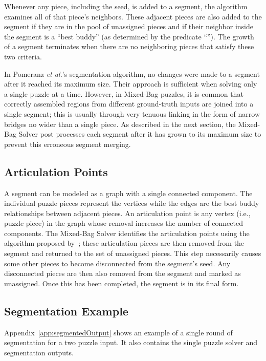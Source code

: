 Whenever any piece, including the seed, is added to a segment, the algorithm examines all of that piece's neighbors.  These adjacent pieces are also added to the segment if they are in the pool of unassigned pieces and if their neighbor inside the segment is a ``best buddy'' (as determined by the predicate ``'').  The growth of a segment terminates when there are no neighboring pieces that satisfy these two criteria. 

In Pomeranz \textit{et al.}'s segmentation algorithm, no changes were made to a segment after it reached its maximum size.  Their approach is sufficient when solving only a single puzzle at a time.  However, in Mixed-Bag puzzles, it is common that correctly assembled regions from different ground-truth inputs are joined into a single segment; this is usually through very tenuous linking in the form of narrow bridges no wider than a single piece.  As described in the next section, the Mixed-Bag Solver post processes each segment after it has grown to its maximum size to prevent this erroneous segment merging.

\subsection{Articulation Points}\label{sec:articulationPoints}

A segment can be modeled as a graph with a single connected component.  The individual puzzle pieces represent the vertices while the edges are the best buddy relationships between adjacent pieces.  An articulation point is any vertex (i.e., puzzle piece) in the graph whose removal increases the number of connected components.  The Mixed-Bag Solver identifies the articulation points using the algorithm proposed by~\cite{cormenIntroToAlgorithms}; these articulation pieces are then removed from the segment and returned to the set of unassigned pieces.  This step necessarily causes some other pieces to become disconnected from the segment's seed.  Any disconnected pieces are then also removed from the segment and marked as unassigned. Once this has been completed, the segment is in its final form.

\subsection{Segmentation Example}

Appendix~\ref{app:segmentedOutput} shows an example of a single round of segmentation for a two puzzle input. It also contains the single puzzle solver and segmentation outputs.

